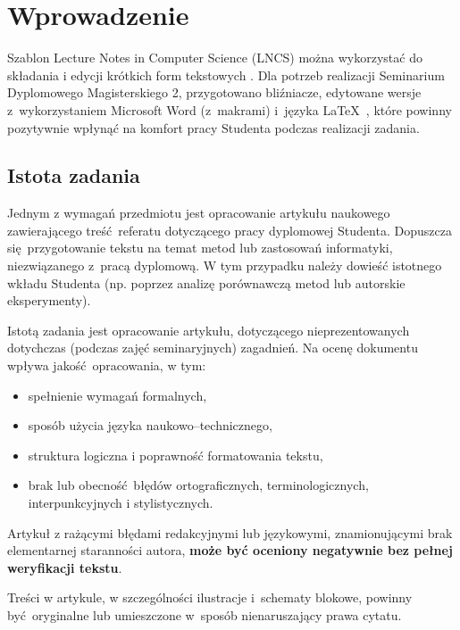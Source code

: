 \section{Wprowadzenie}
\label{sec:intro}

Szablon Lecture Notes in Computer Science (LNCS) można wykorzystać do składania i edycji krótkich form tekstowych \cite{ref:lncs}. Dla potrzeb realizacji Seminarium Dyplomowego Magisterskiego 2, przygotowano bliźniacze, edytowane wersje z~wykorzystaniem Microsoft Word (z~makrami) i~języka \LaTeX~\cite{ref:latex}, które powinny pozytywnie wpłynąć na komfort pracy Studenta podczas realizacji zadania.

\subsection{Istota zadania}
\label{subsec:essence}

Jednym z wymagań przedmiotu jest opracowanie artykułu naukowego zawierającego treść referatu dotyczącego pracy dyplomowej Studenta. Dopuszcza się przygotowanie tekstu na temat metod lub zastosowań informatyki, niezwiązanego z~pracą dyplomową. W tym przypadku należy dowieść istotnego wkładu Studenta (np. poprzez analizę porównawczą metod lub autorskie eksperymenty).

Istotą zadania jest opracowanie artykułu, dotyczącego nieprezentowanych dotychczas (podczas zajęć seminaryjnych) zagadnień. Na ocenę dokumentu wpływa jakość opracowania, w tym:

\begin{itemize}[noitemsep]
	\item spełnienie wymagań formalnych,
	\item sposób użycia języka naukowo--technicznego,
	\item struktura logiczna i poprawność formatowania tekstu,
	\item brak lub obecność błędów ortograficznych, terminologicznych, interpunkcyjnych i stylistycznych.
\end{itemize}

\begin{note}
	Artykuł z rażącymi błędami redakcyjnymi lub językowymi, znamionującymi brak elementarnej staranności autora, \textbf{może być oceniony negatywnie bez pełnej weryfikacji tekstu}.
\end{note}

\begin{note}
	Treści w artykule, w szczególności ilustracje i~schematy blokowe, powinny być oryginalne lub umieszczone w~sposób nienaruszający prawa cytatu.
\end{note}

